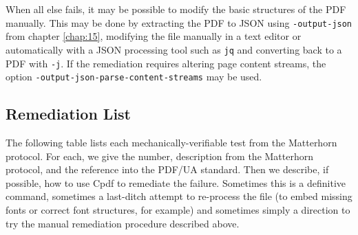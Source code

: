 \documentclass{book}
\begin{document}
When all else fails, it may be possible to modify the basic structures of the PDF manually. This may be done by extracting the PDF to JSON using \texttt{-output-json} from chapter \ref{chap:15}, modifying the file manually in a text editor or automatically with a JSON processing tool such as \texttt{jq} and converting back to a PDF with \texttt{-j}. If the remediation requires altering page content streams, the option \texttt{-output-json-parse-content-streams} may be used. 

\subsection{Remediation List}

The following table lists each mechanically-verifiable test from the Matterhorn protocol. For each, we give the number, description from the Matterhorn protocol, and the reference into the PDF/UA standard. Then we describe, if possible, how to use Cpdf to remediate the failure. Sometimes this is a definitive command, sometimes a last-ditch attempt to re-process the file (to embed missing fonts or correct font structures, for example) and sometimes simply a direction to try the manual remediation procedure described above.

\newcommand{\norem}{File does not meet Tagged PDF standard - only manual remediation possible (see description above this table).}
\newcommand{\noremua}{File does not meet PDF/UA tagging standard - only manual remediation possible (see description above this table).}
\newcommand{\manonly}{File does not meet PDF/UA standard - only manual remediation possible (see description above this table).}
\newcommand{\gsfonts}{It is possible that reprocessing the file with \texttt{gs} using \texttt{cpdf in.pdf -gs gs -gs-malformed-force -o out.pdf [-gs-quiet]} will correct the fonts.}
\newcommand{\remannot}{If annotations are not required, they may be removed with \texttt{cpdf -remove-annotations in.pdf -o out.pdf}.}
\newcommand{\delannot}{Alternatively, use \texttt{-list-annotations-json} and \texttt{-set-annotations} as described in Chapter \ref{chap:10} to remove one or more specific annotations.}
\newcommand{\edittree}{Alternatively, edit the tree manually using \texttt{-extract-struct-tree} and \texttt{-replace-struct-tree} from this chapter.}
\newcommand{\setlang}{Assuming the document is all in a single language, set the top-level language with, for example, \texttt{cpdf -set-language "en-US" in.pdf -o out.pdf}. If the document contains multiple languages, only manual remediation is possible.}
\end{document}
